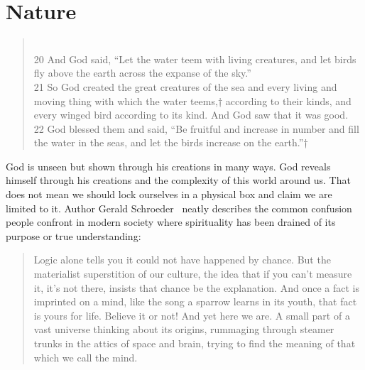\documentclass[11pt,a4paper]{scrartcl} %
\begin{document}
\section{Nature}
\begin{verse}
\textcolor{Maroon}{}\\
20 And God said, “Let the water teem with living creatures, and let birds fly above the earth across the expanse of the sky.” \\
21 So God created the great creatures of the sea and every living and moving thing with which the water teems,† according to their kinds, and every winged bird according to its kind. And God saw that it was good. \\
22 God blessed them and said, “Be fruitful and increase in number and fill the water in the seas, and let the birds increase on the earth.”† 
\end{verse}
\begin{doublespace}
God is unseen but shown through his creations in many ways. God reveals himself through his creations and the complexity of this world around us. That does not mean we should lock ourselves in a physical box and claim we are limited to it. Author Gerald Schroeder~\cite{GLSchroeder-2001} neatly describes the common confusion people confront in modern society where spirituality has been drained of its purpose or true understanding:
\end{doublespace}
\begin{quote}
Logic alone tells you it could not have happened by chance. But the materialist superstition of our culture, the idea that if you can’t measure it, it’s not there, insists that chance be the explanation. And once a fact is imprinted on a mind, like the song a sparrow learns in its youth, that fact is yours for life. Believe it or not! And yet here we are. A small part of a vast universe thinking about its origins, rummaging through steamer trunks in the attics of space and brain, trying to find the meaning of that which we call the mind. 
\end{quote}
\end{document}
